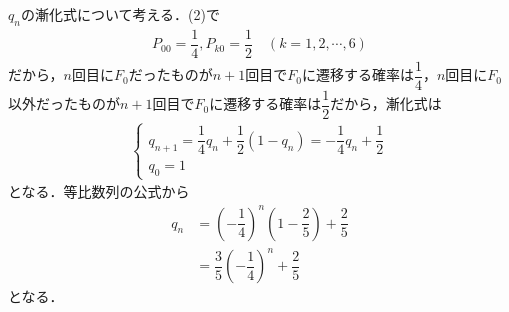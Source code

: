 \documentclass[../../main.tex]{subfiles}
\begin{document}
$q_n$の漸化式について考える．(2)で
\begin{align}
  P_{00} = \dfrac{1}{4}, P_{k0} = \dfrac{1}{2} \quad (k=1,2,\cdots,6)
\end{align}
だから，$n$回目に$F_{0}$だったものが$n+1$回目で$F_{0}$に遷移する確率は$\dfrac{1}{4}$，$n$回目に$F_{0}$以外だったものが$n+1$回目で$F_{0}$に遷移する確率は$\dfrac{1}{2}$だから，漸化式は
\begin{align}
  \begin{cases}
    q_{n+1} = \dfrac{1}{4}q_n + \dfrac{1}{2}(1-q_n)
    = -\dfrac{1}{4}q_n + \dfrac{1}{2} \\
    q_0 = 1
  \end{cases}
\end{align}
となる．等比数列の公式から
\begin{align}
  q_n
  &= \left(-\dfrac{1}{4}\right)^n \left(1 - \dfrac{2}{5}\right) + \dfrac{2}{5} \\
  &= \dfrac{3}{5}\left(-\dfrac{1}{4}\right)^n + \dfrac{2}{5}
\end{align}
となる．
\end{document}
